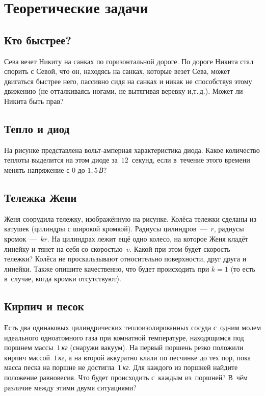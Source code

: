 \documentclass[a4paper,12pt]{article}
\newcommand\un[1]{\,\emph{#1}}
\begin{document}
\section{Теоретические задачи}

\subsection{Кто быстрее?}
Сева везет Никиту на санках по горизонтальной дороге. По дороге Никита стал спорить с Севой,
что он, находясь на санках, которые везет Сева, может двигаться быстрее него, пассивно сидя
на санках и никак не способствуя этому движению (не отталкиваясь ногами, не вытягивая веревку
и,т.\,д.). Может ли Никита быть прав?

\subsection{Тепло и диод} На рисунке представлена вольт-амперная характеристика диода.
Какое количество теплоты выделится на этом диоде за~$12$~секунд, если в~течение этого
времени менять напряжение с $0$ до $ 1,5$\un{В}?



\subsection{Тележка Жени}
Женя соорудила тележку, изображённую на рисунке. Колёса тележки сделаны из катушек
(цилиндры с широкой кромкой). Радиусы цилиндров~---~$r$, радиусы кромок~---~$kr$.
На цилиндрах лежит ещё одно колесо, на которое Женя кладёт линейку и тянет на себя
со скоростью~$v$. Какой при этом будет скорость тележки? Колёса не проскальзывают
относительно поверхности, друг друга и линейки. Также опишите качественно,
что будет происходить при $k = 1$ (то есть в~случае, когда кромки отсутствуют).



\subsection{Кирпич и песок}
Есть два одинаковых цилиндрических теплоизолированных сосуда с~одним молем идеального одноатомного газа
при комнатной температуре, находящимся под поршнем массы~$1$\un{кг} (снаружи вакуум). На первый поршень
резко положили кирпич массой~$1$\un{кг}, а на второй аккуратно клали по песчинке до тех пор, пока масса
песка на поршне не достигла~$1$\un{кг}. Для каждого из поршней найдите положение равновесия. Что будет
происходить с~каждым из~поршней? В~чём различие между этими двумя ситуациями?
\end{document}
